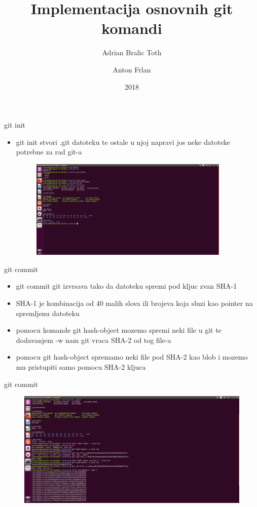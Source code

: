 \documentclass[]{beamer}
\title{Implementacija osnovnih git komandi}
\author{Adrian Bralic Toth \and Anton Frlan}
\institute{Tehnički Fakultet Rijeka}
\date{2018}
\begin{document}
\frame{\titlepage}

\begin{frame}{git init}

\begin{itemize}
	\setlength\itemsep{2em}
	\item git init stvori .git datoteku te ostale u njoj napravi jos neke datoteke potrebne za rad git-a
	\begin{figure}
\centering
\includegraphics[width=0.9\textwidth]{./slike/git_datoteka.jpg}
\end{figure}
\end{itemize}

\end{frame}


\begin{frame}{git commit}

\begin{itemize}
	\setlength\itemsep{2.5em}
	\item git commit git izvrsava tako da datoteku spremi pod kljuc zvan SHA-1
	\item SHA-1 je kombinacija od 40 malih slova ili brojeva koja sluzi kao pointer na spremljenu datoteku
	\item pomocu komande git hash-object mozemo spremi neki file u git te dodavanjem -w nam git vraca SHA-2 od tog file-a
	\item pomocu git hash-object spremamo neki file pod SHA-2 kao blob i mozemo mu pristupiti samo pomocu SHA-2 kljuca
\end{itemize}

\end{frame}

\begin{frame}{git commit}
\begin{figure}
\centering
\includegraphics[width=1\textwidth]{./slike/druga_slika.jpg}
\end{figure}

\end{frame}
\end{document}
